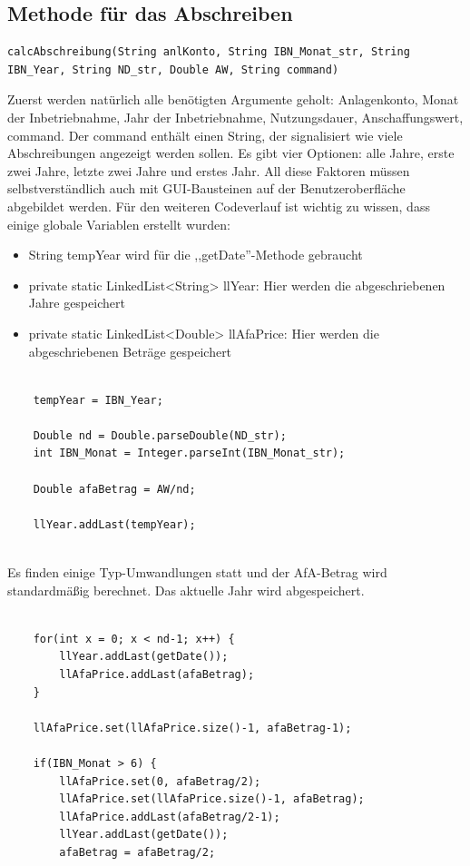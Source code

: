 \documentclass[12pt]{report}
\begin{document}
\subsection{Methode für das Abschreiben}
  
\begin{lstlisting}
calcAbschreibung(String anlKonto, String IBN_Monat_str, String IBN_Year, String ND_str, Double AW, String command)
\end{lstlisting}
Zuerst werden natürlich alle benötigten Argumente geholt: Anlagenkonto, Monat der Inbetriebnahme, Jahr der Inbetriebnahme, Nutzungsdauer, Anschaffungswert, command. Der command enthält einen String, der signalisiert wie viele Abschreibungen angezeigt werden sollen. Es gibt vier Optionen: alle Jahre, erste zwei Jahre, letzte zwei Jahre und erstes Jahr. All diese Faktoren müssen selbstverständlich auch mit GUI-Bausteinen auf der Benutzeroberfläche abgebildet werden.
Für den weiteren Codeverlauf ist wichtig zu wissen, dass einige globale Variablen erstellt wurden:\\

\begin{itemize}
	\item String tempYear wird für die ,,getDate''-Methode gebraucht
	\item private static LinkedList<String> llYear: Hier werden die abgeschriebenen Jahre gespeichert
	\item private static LinkedList<Double> llAfaPrice: Hier werden die abgeschriebenen Beträge gespeichert
\end{itemize}


\begin{lstlisting}
		
	tempYear = IBN_Year;
		
	Double nd = Double.parseDouble(ND_str);
	int IBN_Monat = Integer.parseInt(IBN_Monat_str);
	
	Double afaBetrag = AW/nd;
	
	llYear.addLast(tempYear);
	
\end{lstlisting}
Es finden einige Typ-Umwandlungen statt und der AfA-Betrag wird standardmäßig berechnet. Das aktuelle Jahr wird abgespeichert.\\

\begin{lstlisting}
					
	for(int x = 0; x < nd-1; x++) {
		llYear.addLast(getDate());
		llAfaPrice.addLast(afaBetrag);
	}
	
	llAfaPrice.set(llAfaPrice.size()-1, afaBetrag-1);
	
	if(IBN_Monat > 6) {
		llAfaPrice.set(0, afaBetrag/2);
		llAfaPrice.set(llAfaPrice.size()-1, afaBetrag);
		llAfaPrice.addLast(afaBetrag/2-1);
		llYear.addLast(getDate());
		afaBetrag = afaBetrag/2;
		
\end{lstlisting}
\end{document}
